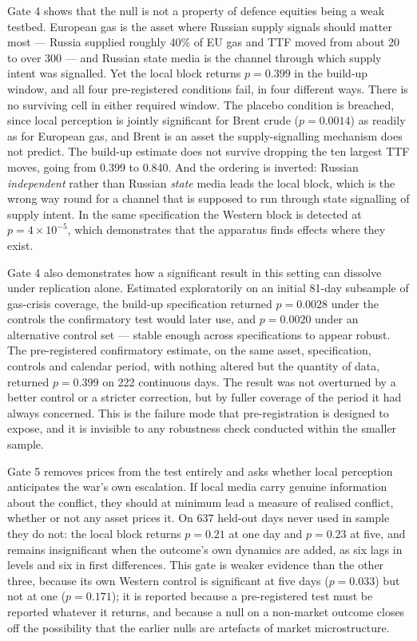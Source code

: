 \documentclass[12pt,a4paper]{article}
\begin{document}
Gate 4 shows that the null is not a property of defence equities being a weak testbed. European gas is the asset where Russian supply signals should matter most --- Russia supplied roughly 40\% of EU gas and TTF moved from about \texteuro{}20 to over \texteuro{}300 --- and Russian state media is the channel through which supply intent was signalled. Yet the local block returns $p = 0.399$ in the build-up window, and all four pre-registered conditions fail, in four different ways. There is no surviving cell in either required window. The placebo condition is breached, since local perception is jointly significant for Brent crude ($p = 0.0014$) as readily as for European gas, and Brent is an asset the supply-signalling mechanism does not predict. The build-up estimate does not survive dropping the ten largest TTF moves, going from 0.399 to 0.840. And the ordering is inverted: Russian \textit{independent} rather than Russian \textit{state} media leads the local block, which is the wrong way round for a channel that is supposed to run through state signalling of supply intent. In the same specification the Western block is detected at $p = 4\times10^{-5}$, which demonstrates that the apparatus finds effects where they exist.

Gate 4 also demonstrates how a significant result in this setting can dissolve under replication alone. Estimated exploratorily on an initial 81-day subsample of gas-crisis coverage, the build-up specification returned $p = 0.0028$ under the controls the confirmatory test would later use, and $p = 0.0020$ under an alternative control set --- stable enough across specifications to appear robust. The pre-registered confirmatory estimate, on the same asset, specification, controls and calendar period, with nothing altered but the quantity of data, returned $p = 0.399$ on 222 continuous days. The result was not overturned by a better control or a stricter correction, but by fuller coverage of the period it had always concerned. This is the failure mode that pre-registration is designed to expose, and it is invisible to any robustness check conducted within the smaller sample.

Gate 5 removes prices from the test entirely and asks whether local perception anticipates the war's own escalation. If local media carry genuine information about the conflict, they should at minimum lead a measure of realised conflict, whether or not any asset prices it. On 637 held-out days never used in sample they do not: the local block returns $p = 0.21$ at one day and $p = 0.23$ at five, and remains insignificant when the outcome's own dynamics are added, as six lags in levels and six in first differences. This gate is weaker evidence than the other three, because its own Western control is significant at five days ($p = 0.033$) but not at one ($p = 0.171$); it is reported because a pre-registered test must be reported whatever it returns, and because a null on a non-market outcome closes off the possibility that the earlier nulls are artefacts of market microstructure.
\end{document}
